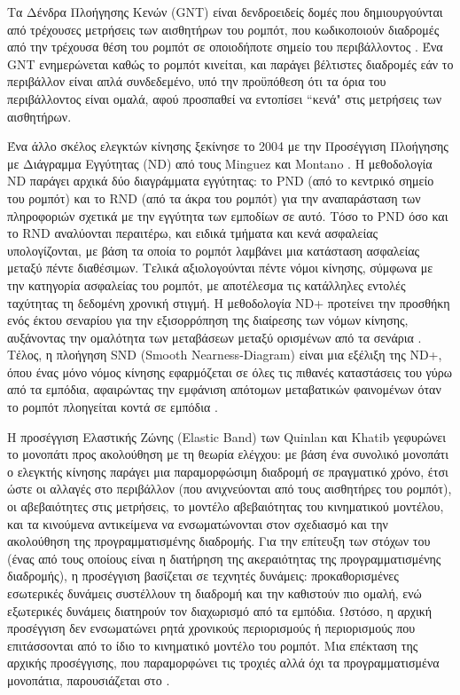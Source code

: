 Τα Δένδρα Πλοήγησης Κενών (GNT) είναι δενδροειδείς δομές που δημιουργούνται από
τρέχουσες μετρήσεις των αισθητήρων του ρομπότ, που κωδικοποιούν διαδρομές από
την τρέχουσα θέση του ρομπότ σε οποιοδήποτε σημείο του περιβάλλοντος
\cite{Tovar2005}. Ένα GNT ενημερώνεται καθώς το ρομπότ κινείται, και παράγει
βέλτιστες διαδρομές εάν το περιβάλλον είναι απλά συνδεδεμένο, υπό την
προϋπόθεση ότι τα όρια του περιβάλλοντος είναι ομαλά, αφού προσπαθεί να
εντοπίσει ``κενά" στις μετρήσεις των αισθητήρων.

Ένα άλλο σκέλος ελεγκτών κίνησης ξεκίνησε το 2004 με την Προσέγγιση Πλοήγησης
με Διάγραμμα Εγγύτητας (ND) από τους Minguez και Montano \cite{Mingueza}. Η
μεθοδολογία ND παράγει αρχικά δύο διαγράμματα εγγύτητας: το PND (από το
κεντρικό σημείο του ρομπότ) και το RND (από τα άκρα του ρομπότ) για την
αναπαράσταση των πληροφοριών σχετικά με την εγγύτητα των εμποδίων σε αυτό. Τόσο
το PND όσο και το RND αναλύονται περαιτέρω, και ειδικά τμήματα και κενά
ασφαλείας υπολογίζονται, με βάση τα οποία το ρομπότ λαμβάνει μια κατάσταση
ασφαλείας μεταξύ πέντε διαθέσιμων. Τελικά αξιολογούνται πέντε νόμοι κίνησης,
σύμφωνα με την κατηγορία ασφαλείας του ρομπότ, με αποτέλεσμα τις κατάλληλες
εντολές ταχύτητας τη δεδομένη χρονική στιγμή. Η μεθοδολογία ND+ προτείνει την
προσθήκη ενός έκτου σεναρίου για την εξισορρόπηση της διαίρεσης των νόμων
κίνησης, αυξάνοντας την ομαλότητα των μεταβάσεων μεταξύ ορισμένων από τα
σενάρια \cite{Minguez2004a}. Τέλος, η πλοήγηση SND (Smooth Nearness-Diagram)
είναι μια εξέλιξη της ND+, όπου ένας μόνο νόμος κίνησης εφαρμόζεται σε όλες τις
πιθανές καταστάσεις του γύρω από τα εμπόδια, αφαιρώντας την εμφάνιση απότομων
μεταβατικών φαινομένων όταν το ρομπότ πλοηγείται κοντά σε εμπόδια
\cite{Durham2008}.

Η προσέγγιση Ελαστικής Ζώνης (Elastic Band) των Quinlan και Khatib
\cite{Quinlan} γεφυρώνει το μονοπάτι προς ακολούθηση με τη θεωρία ελέγχου: με
βάση ένα συνολικό μονοπάτι ο ελεγκτής κίνησης παράγει μια παραμορφώσιμη
διαδρομή σε πραγματικό χρόνο, έτσι ώστε οι αλλαγές στο περιβάλλον (που
ανιχνεύονται από τους αισθητήρες του ρομπότ), οι αβεβαιότητες στις μετρήσεις,
το μοντέλο αβεβαιότητας του κινηματικού μοντέλου, και τα κινούμενα αντικείμενα
να ενσωματώνονται στον σχεδιασμό και την ακολούθηση της προγραμματισμένης
διαδρομής. Για την επίτευξη των στόχων του (ένας από τους οποίους είναι η
διατήρηση της ακεραιότητας της προγραμματισμένης διαδρομής), η προσέγγιση
βασίζεται σε τεχνητές δυνάμεις: προκαθορισμένες εσωτερικές δυνάμεις συστέλλουν
τη διαδρομή και την καθιστούν πιο ομαλή, ενώ εξωτερικές δυνάμεις διατηρούν τον
διαχωρισμό από τα εμπόδια. Ωστόσο, η αρχική προσέγγιση δεν ενσωματώνει ρητά
χρονικούς περιορισμούς ή περιορισμούς που επιτάσσονται από το ίδιο το
κινηματικό μοντέλο του ρομπότ. Μια επέκταση της αρχικής προσέγγισης, που
παραμορφώνει τις τροχιές αλλά όχι τα προγραμματισμένα μονοπάτια, παρουσιάζεται
στο \cite{Kurniawati2007}.

